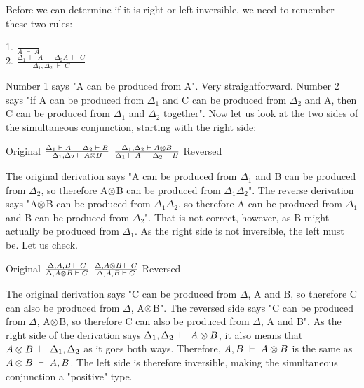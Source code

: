 Before we can determine if it is right or left inversible, we need to remember these two rules:
\begin{texto}
	1. $\frac{ }{A \;\vdash\; A}$\\ \vspace{5pt}
	2. $\frac{\Delta_1 \;\vdash\; A \hspace{20pt} \Delta_2 A \;\vdash\; C}{\Delta_1 , \Delta_2 \;\vdash\; C}$ \hspace{30pt}
\end{texto}
Number 1 says "A can be produced from A". Very straightforward. Number 2 says "if A can be produced from $\Delta_1$ and C can be produced from $\Delta_2$ and A, then C can be produced from $\Delta_1$ and $\Delta_2$ together". Now let us look at the two sides of the simultaneous conjunction, starting with the right side:
\begin{texto}
	Original $\frac{\Delta_1 \;\vdash\; A \hspace{12pt} \Delta_2 \;\vdash\; B}{\Delta_1 , \Delta_2 \;\vdash\; A \otimes B}$ \hspace{50pt}
	$\frac{\Delta_1 , \Delta_2 \;\vdash\; A \otimes B}{\Delta_1 \;\vdash\; A \hspace{12pt} \Delta_2 \;\vdash\; B}$ Reversed
\end{texto}
The original derivation says "A can be produced from $\Delta_1$ and B can be produced from $\Delta_2$, so therefore A$\otimes$B can be produced from $\Delta_1$$\Delta_2$". The reverse derivation says "A$\otimes$B can be produced from $\Delta_1$$\Delta_2$, so therefore A can be produced from $\Delta_1$ and B can be produced from $\Delta_2$". That is not correct, however, as B might actually be produced from $\Delta_1$. As the right side is not inversible, the left must be. Let us check.
\begin{texto}
	Original $\frac{\Delta , A, B \;\vdash\; C}{\Delta , A \otimes B \;\vdash\; C}$ \hspace{50pt}
	$\frac{\Delta , A \otimes B \;\vdash\; C}{\Delta , A, B \;\vdash\; C}$ Reversed
\end{texto}
The original derivation says "C can be produced from $\Delta$, A and B, so therefore C can also be produced from $\Delta$, A$\otimes$B". The reversed side says "C can be produced from $\Delta$, A$\otimes$B, so therefore C can also be produced from $\Delta$, A and B". As the right side of the derivation says $\Delta_1 , \Delta_2 \;\vdash\; A \otimes B$, it also means that $A \otimes B \;\vdash\; \Delta_1 , \Delta_2$ as it goes both ways. Therefore, $A , B \;\vdash\; A \otimes B$ is the same as $A \otimes B \;\vdash\; A , B$. The left side is therefore inversible, making the simultaneous conjunction a "positive" type.

